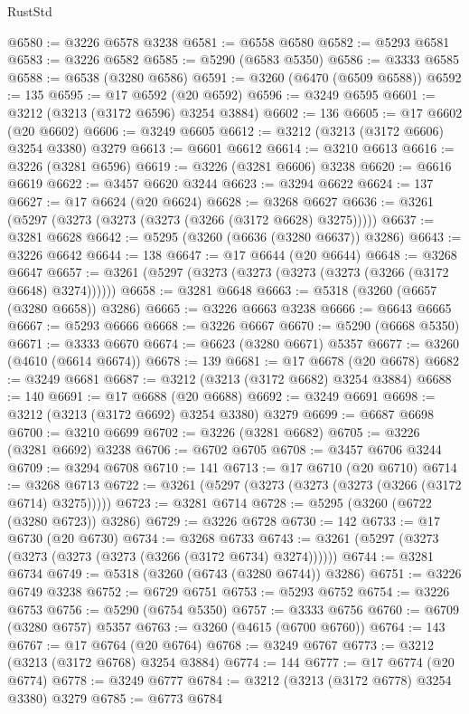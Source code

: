 \begin{lexlean}{RustStd}
\begin{coremodule}
{\begin{coremodule}
{{{{{{{{{{{{{{{{{{{{{{{{{{@6580 := @3226 @6578 @3238
@6581 := @6558 @6580
@6582 := @5293 @6581
@6583 := @3226 @6582
@6585 := @5290 (@6583 @5350)
@6586 := @3333 @6585
@6588 := @6538 (@3280 @6586)
@6591 := @3260 (@6470 (@6509 @6588))
@6592 := 135
@6595 := @17 @6592 (@20 @6592)
@6596 := @3249 @6595
@6601 := @3212 (@3213 (@3172 @6596) @3254 @3884)
@6602 := 136
@6605 := @17 @6602 (@20 @6602)
@6606 := @3249 @6605
@6612 := @3212 (@3213 (@3172 @6606) @3254 @3380) @3279
@6613 := @6601 @6612
@6614 := @3210 @6613
@6616 := @3226 (@3281 @6596)
@6619 := @3226 (@3281 @6606) @3238
@6620 := @6616 @6619
@6622 := @3457 @6620 @3244
@6623 := @3294 @6622
@6624 := 137
@6627 := @17 @6624 (@20 @6624)
@6628 := @3268 @6627
@6636 := @3261 (@5297 (@3273 (@3273 (@3273 (@3266 (@3172 @6628) @3275)))))
@6637 := @3281 @6628
@6642 := @5295 (@3260 (@6636 (@3280 @6637)) @3286)
@6643 := @3226 @6642
@6644 := 138
@6647 := @17 @6644 (@20 @6644)
@6648 := @3268 @6647
@6657 := @3261 (@5297 (@3273 (@3273 (@3273 (@3273 (@3266 (@3172 @6648) @3274))))))
@6658 := @3281 @6648
@6663 := @5318 (@3260 (@6657 (@3280 @6658)) @3286)
@6665 := @3226 @6663 @3238
@6666 := @6643 @6665
@6667 := @5293 @6666
@6668 := @3226 @6667
@6670 := @5290 (@6668 @5350)
@6671 := @3333 @6670
@6674 := @6623 (@3280 @6671) @5357
@6677 := @3260 (@4610 (@6614 @6674))
@6678 := 139
@6681 := @17 @6678 (@20 @6678)
@6682 := @3249 @6681
@6687 := @3212 (@3213 (@3172 @6682) @3254 @3884)
@6688 := 140
@6691 := @17 @6688 (@20 @6688)
@6692 := @3249 @6691
@6698 := @3212 (@3213 (@3172 @6692) @3254 @3380) @3279
@6699 := @6687 @6698
@6700 := @3210 @6699
@6702 := @3226 (@3281 @6682)
@6705 := @3226 (@3281 @6692) @3238
@6706 := @6702 @6705
@6708 := @3457 @6706 @3244
@6709 := @3294 @6708
@6710 := 141
@6713 := @17 @6710 (@20 @6710)
@6714 := @3268 @6713
@6722 := @3261 (@5297 (@3273 (@3273 (@3273 (@3266 (@3172 @6714) @3275)))))
@6723 := @3281 @6714
@6728 := @5295 (@3260 (@6722 (@3280 @6723)) @3286)
@6729 := @3226 @6728
@6730 := 142
@6733 := @17 @6730 (@20 @6730)
@6734 := @3268 @6733
@6743 := @3261 (@5297 (@3273 (@3273 (@3273 (@3273 (@3266 (@3172 @6734) @3274))))))
@6744 := @3281 @6734
@6749 := @5318 (@3260 (@6743 (@3280 @6744)) @3286)
@6751 := @3226 @6749 @3238
@6752 := @6729 @6751
@6753 := @5293 @6752
@6754 := @3226 @6753
@6756 := @5290 (@6754 @5350)
@6757 := @3333 @6756
@6760 := @6709 (@3280 @6757) @5357
@6763 := @3260 (@4615 (@6700 @6760))
@6764 := 143
@6767 := @17 @6764 (@20 @6764)
@6768 := @3249 @6767
@6773 := @3212 (@3213 (@3172 @6768) @3254 @3884)
@6774 := 144
@6777 := @17 @6774 (@20 @6774)
@6778 := @3249 @6777
@6784 := @3212 (@3213 (@3172 @6778) @3254 @3380) @3279
@6785 := @6773 @6784
}}}}}}}}}}}}}}}}}}}}}}}}}}
\end{coremodule}}
\end{coremodule}
\end{lexlean}
